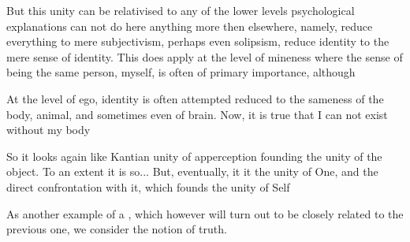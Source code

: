 {But this unity can be relativised to any of the lower levels
psychological explanations can not do here anything more then elsewhere, namely,
reduce everything to mere subjectivism, perhaps even solipsism, reduce identity
to the mere sense of identity. This does apply at the level of mineness where the
sense of being the same person, myself, is often of primary importance, although

At the level of ego, identity is often attempted reduced to the sameness of the
body, animal, and sometimes even of brain. Now, it is true that I can not exist
without my body


So it looks again like Kantian unity of apperception founding the unity of the
object. To an extent it is so... But, eventually, it it the unity of One, and
the direct confrontation with it, which founds the unity of Self

} %


\label{sub:truth}
As another example of a , which however will turn out to be closely
related to the previous one, we consider the notion of truth. 


